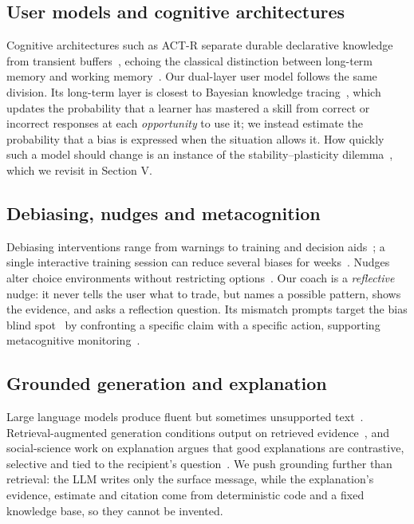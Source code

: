 \documentclass[conference]{IEEEtran}
\begin{document}
\subsection{User models and cognitive architectures}
Cognitive architectures such as ACT-R separate durable declarative knowledge from transient buffers~\cite{actr04}, echoing the classical distinction between long-term memory and working memory~\cite{as68}. Our dual-layer user model follows the same division. Its long-term layer is closest to Bayesian knowledge tracing~\cite{ca94}, which updates the probability that a learner has mastered a skill from correct or incorrect responses at each \textit{opportunity} to use it; we instead estimate the probability that a bias is expressed when the situation allows it. How quickly such a model should change is an instance of the stability--plasticity dilemma~\cite{grossberg87}, which we revisit in Section V.

\subsection{Debiasing, nudges and metacognition}
Debiasing interventions range from warnings to training and decision aids~\cite{fischhoff82,larrick04}; a single interactive training session can reduce several biases for weeks~\cite{morewedge15}. Nudges alter choice environments without restricting options~\cite{ts08}. Our coach is a \textit{reflective} nudge: it never tells the user what to trade, but names a possible pattern, shows the evidence, and asks a reflection question. Its mismatch prompts target the bias blind spot~\cite{pronin02} by confronting a specific claim with a specific action, supporting metacognitive monitoring~\cite{flavell79}.

\subsection{Grounded generation and explanation}
Large language models produce fluent but sometimes unsupported text~\cite{ji23}. Retrieval-augmented generation conditions output on retrieved evidence~\cite{lewis20}, and social-science work on explanation argues that good explanations are contrastive, selective and tied to the recipient's question~\cite{miller19}. We push grounding further than retrieval: the LLM writes only the surface message, while the explanation's evidence, estimate and citation come from deterministic code and a fixed knowledge base, so they cannot be invented.
\end{document}
